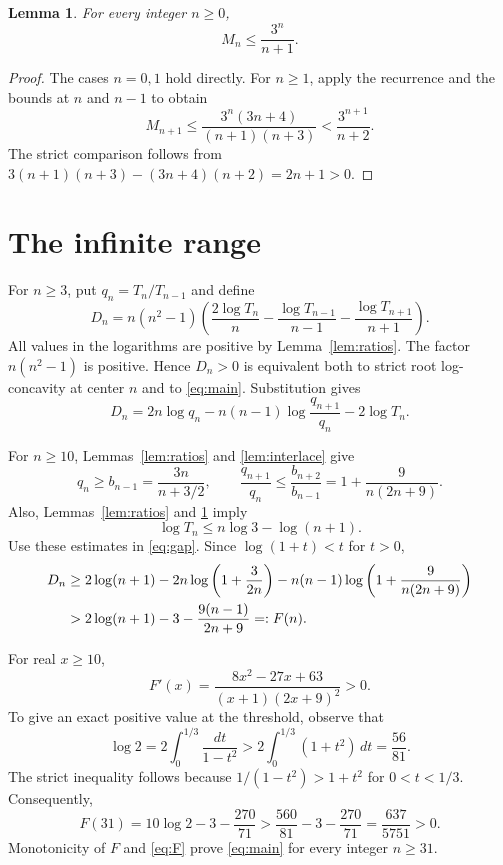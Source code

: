 \documentclass[11pt]{article}
\newtheorem{lemma}[theorem]{Lemma}
\begin{document}
\begin{lemma}\label{lem:size}
For every integer $n\ge0$,
\begin{equation}\label{eq:size}
M_n\le\frac{3^n}{n+1}.
\end{equation}
\end{lemma}

\begin{proof}
The cases $n=0,1$ hold directly. For $n\ge1$, apply the recurrence and
the bounds at $n$ and $n-1$ to obtain
\[
M_{n+1}\le\frac{3^n(3n+4)}{(n+1)(n+3)}
<\frac{3^{n+1}}{n+2}.
\]
The strict comparison follows from
$3(n+1)(n+3)-(3n+4)(n+2)=2n+1>0$.
\end{proof}

\section{The infinite range}

For $n\ge3$, put $q_n=T_n/T_{n-1}$ and define
\[
D_n=n(n^2-1)
\left(\frac{2\log T_n}{n}
-\frac{\log T_{n-1}}{n-1}
-\frac{\log T_{n+1}}{n+1}\right).
\]
All values in the logarithms are positive by Lemma~\ref{lem:ratios}.
The factor $n(n^2-1)$ is positive. Hence $D_n>0$ is equivalent both to
strict root log-concavity at center $n$ and to \eqref{eq:main}.
Substitution gives
\begin{equation}\label{eq:gap}
D_n=2n\log q_n
-n(n-1)\log\frac{q_{n+1}}{q_n}-2\log T_n.
\end{equation}

For $n\ge10$, Lemmas~\ref{lem:ratios} and \ref{lem:interlace} give
\[
q_n\ge b_{n-1}=\frac{3n}{n+3/2},\qquad
\frac{q_{n+1}}{q_n}
\le\frac{b_{n+2}}{b_{n-1}}
=1+\frac9{n(2n+9)}.
\]
Also, Lemmas~\ref{lem:ratios} and \ref{lem:size} imply
\[
\log T_n\le n\log3-\log(n+1).
\]
Use these estimates in \eqref{eq:gap}. Since $\log(1+t)<t$ for $t>0$,
\begin{align}
D_n
&\ge 2\log(n+1)
-2n\log\left(1+\frac3{2n}\right)
-n(n-1)\log\left(1+\frac9{n(2n+9)}\right)\notag\\
&>2\log(n+1)-3-\frac{9(n-1)}{2n+9}
=:F(n).\label{eq:F}
\end{align}

For real $x\ge10$,
\[
F'(x)=\frac{8x^2-27x+63}{(x+1)(2x+9)^2}>0.
\]
To give an exact positive value at the threshold, observe that
\[
\log2=2\int_0^{1/3}\frac{dt}{1-t^2}
>2\int_0^{1/3}(1+t^2)\,dt
=\frac{56}{81}.
\]
The strict inequality follows because
$1/(1-t^2)>1+t^2$ for $0<t<1/3$.
Consequently,
\[
F(31)=10\log2-3-\frac{270}{71}
>\frac{560}{81}-3-\frac{270}{71}
=\frac{637}{5751}>0.
\]
Monotonicity of $F$ and \eqref{eq:F} prove \eqref{eq:main} for every
integer $n\ge31$.
\end{document}
